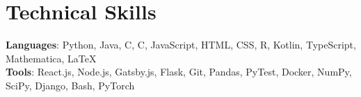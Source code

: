 \documentclass[letterpaper,11pt]{article}
\newcommand{\CC}{C\nolinebreak\hspace{-.05em}\raisebox{.4ex}{\tiny\bf +}\nolinebreak\hspace{-.10em}\raisebox{.4ex}{\tiny\bf +}}
\def\CC{{C\nolinebreak[4]\hspace{-.05em}\raisebox{.4ex}{\tiny\bf ++}}}
\begin{document}
\section{Technical Skills}
 \begin{itemize}[leftmargin=0.10in, label={}]
    \small{\item{
     \textbf{Languages}{: Python, Java, C, \CC, JavaScript, HTML, CSS, R, Kotlin, TypeScript, Mathematica, \LaTeX} \\
     \textbf{Tools}{: React.js, Node.js, Gatsby.js, Flask, Git, Pandas, PyTest, Docker, NumPy, SciPy, Django, Bash, PyTorch} 
    }}
 \end{itemize}
\end{document}
